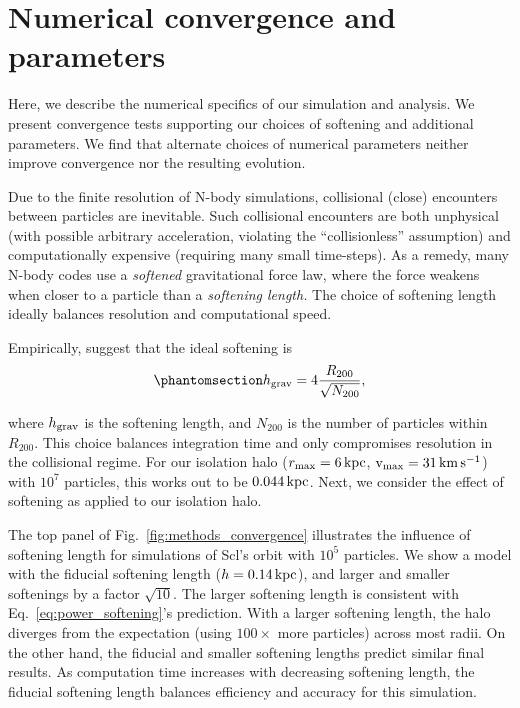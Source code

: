 \chapter{Numerical convergence and
parameters}\label{sec:extra_convergence}

Here, we describe the numerical specifics of our simulation and
analysis. We present convergence tests supporting our choices of
softening and additional parameters. We find that alternate choices of
numerical parameters neither improve convergence nor the resulting
evolution.

Due to the finite resolution of N-body simulations, collisional (close)
encounters between particles are inevitable. Such collisional encounters
are both unphysical (with possible arbitrary acceleration, violating the
``collisionless'' assumption) and computationally expensive (requiring
many small time-steps). As a remedy, many N-body codes use a
\emph{softened} gravitational force law, where the force weakens when
closer to a particle than a \emph{softening length.} The choice of
softening length ideally balances resolution and computational speed.

Empirically, \citet{power+2003} suggest that the ideal softening is
\begin{equation}\protect\phantomsection\label{eq:power_softening}{
h_{\rm grav} = 4 \frac{R_{200}}{\sqrt{N_{200}}},
}\end{equation}

where \(h_{\rm grav}\) is the softening length, and \(N_{200}\) is the
number of particles within \(R_{200}\). This choice balances integration
time and only compromises resolution in the collisional regime. For our
isolation halo (\(r_{\rm max}=6\,{\rm kpc}\), \({\rm v}_{\rm max}=31\,{\rm km\,s^{-1}}\)) with \(10^7\)
particles, this works out to be \(0.044\,{\rm kpc}\). Next, we consider
the effect of softening as applied to our isolation halo.

The top panel of Fig.~\ref{fig:methods_convergence} illustrates the
influence of softening length for simulations of Scl's \smallperi{}
orbit with \(10^5\) particles. We show a model with the fiducial
softening length (\(h=0.14\,{\rm kpc}\)), and larger and smaller softenings
by a factor \(\sqrt{10}\). The larger softening length is consistent
with Eq.~\ref{eq:power_softening}'s prediction. With a larger softening
length, the halo diverges from the expectation (using \(100\times\) more
particles) across most radii. On the other hand, the fiducial and
smaller softening lengths predict similar final results. As computation
time increases with decreasing softening length, the fiducial softening
length balances efficiency and accuracy for this simulation.


